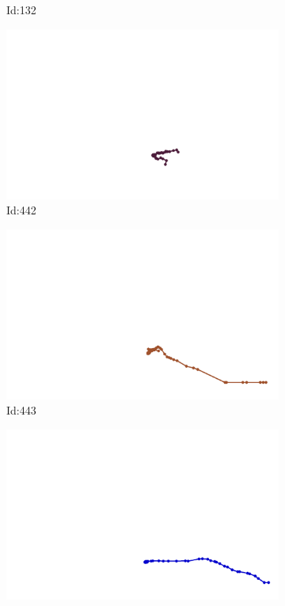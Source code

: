 \documentclass[12pt,twoside]{report}
\begin{document}
\begin{figure}
\begin{subfigure}[b]{0.20\textwidth}
\caption{Id:132}
\end{subfigure}
\begin{subfigure}[b]{0.20\textwidth}
\centering
\includegraphics[width=\textwidth]{../../trajectories/442.png}
\caption{Id:442}
\end{subfigure}
\begin{subfigure}[b]{0.20\textwidth}
\centering
\includegraphics[width=\textwidth]{../../trajectories/443.png}
\caption{Id:443}
\end{subfigure}
\begin{subfigure}[b]{0.20\textwidth}
\centering
\includegraphics[width=\textwidth]{../../trajectories/602.png}

\end{subfigure}
\end{figure}
\end{document}
